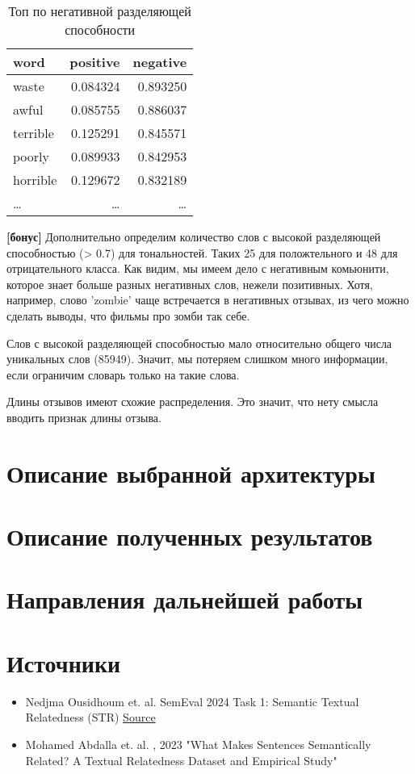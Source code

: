 \documentclass[12pt]{article}
\newcommand{\imgh}[3]
{
\begin{figure}[h]
\center{\texttt{[image: \#2]}}
\caption{#3}
\label{ris:#2}
\end{figure}
}
\begin{document}
\begin{table}[h]
\centering
\begin{tabular}{lrr}
\hline
word & positive & negative \\
\hline
waste & 0.084324 & 0.893250 \\
awful & 0.085755 & 0.886037 \\
terrible & 0.125291 & 0.845571 \\
poorly & 0.089933 & 0.842953 \\
horrible & 0.129672 & 0.832189 \\
\dots & \dots & \dots \\
\hline
\end{tabular}
\caption{Топ по негативной разделяющей способности}
\end{table}

\textbf{[бонус]} Дополнительно определим количество слов с высокой разделяющей способностью (> 0.7) для тональностей. Таких 25 для положтельного и 48 для отрицательного класса. Как видим, мы имеем дело с негативным комьюнити, которое знает больше разных негативных слов, нежели позитивных. Хотя, например, слово 'zombie' чаще встречается в негативных отзывах, из чего можно сделать выводы, что фильмы про зомби так себе. 

Слов с высокой разделяющей способностью мало относительно общего числа уникальных слов (85949). Значит, мы потеряем слишком много информации, если ограничим словарь только на такие слова.


Длины отзывов имеют схожие распределения. Это значит, что нету смысла вводить признак длины отзыва.
\newpage

\section{Описание выбранной архитектуры}
\newpage


\section{Описание полученных результатов}
\newpage


\section{Направления дальнейшей работы}
\newpage


\section{Источники}
\begin{itemize}
    \item Nedjma Ousidhoum et. al. SemEval 2024 Task 1: Semantic Textual Relatedness (STR)
   \href{https://semantic-textual-relatedness.github.io/}{Source}

   \item Mohamed Abdalla et. al. , 2023 "What Makes Sentences Semantically Related?
   A Textual Relatedness Dataset and Empirical Study"
\end{itemize}
\end{document}
